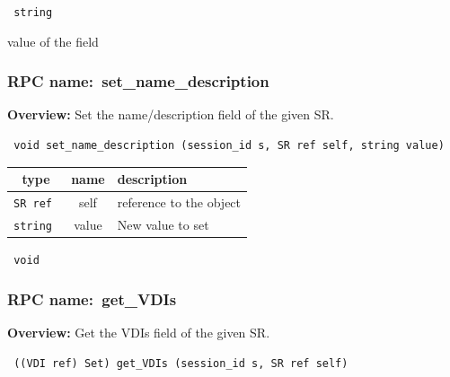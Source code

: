 \vspace{0.3cm}

{\tt 
string
}


value of the field
\vspace{0.3cm}
\vspace{0.3cm}
\vspace{0.3cm}
\subsubsection{RPC name:~set\_name\_description}

{\bf Overview:} 
Set the name/description field of the given SR.

\begin{verbatim} void set_name_description (session_id s, SR ref self, string value)\end{verbatim}



 
\vspace{0.3cm}
\begin{tabular}{|c|c|p{7cm}|}
 \hline
{\bf type} & {\bf name} & {\bf description} \\ \hline
{\tt SR ref } & self & reference to the object \\ \hline 

{\tt string } & value & New value to set \\ \hline 

\end{tabular}

\vspace{0.3cm}

{\tt 
void
}



\vspace{0.3cm}
\vspace{0.3cm}
\vspace{0.3cm}
\subsubsection{RPC name:~get\_VDIs}

{\bf Overview:} 
Get the VDIs field of the given SR.

\begin{verbatim} ((VDI ref) Set) get_VDIs (session_id s, SR ref self)\end{verbatim}



